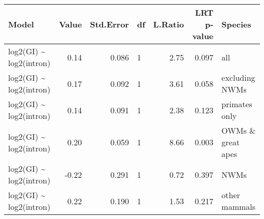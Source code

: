 \begin{table}[ht]
\centering
\begin{tabular}{lrrlrrl}
  \hline
Model & Value & Std.Error & df & L.Ratio & LRT p-value & Species \\ 
  \hline
log2(GI) \~{} log2(intron) & 0.14 & 0.086 & 1 & 2.75 & 0.097 & all \\ 
  log2(GI) \~{} log2(intron) & 0.17 & 0.092 & 1 & 3.61 & 0.058 & excluding NWMs \\ 
  log2(GI) \~{} log2(intron) & 0.14 & 0.091 & 1 & 2.38 & 0.123 & primates only \\ 
  log2(GI) \~{} log2(intron) & 0.20 & 0.059 & 1 & 8.66 & 0.003 & OWMs \& great apes \\ 
  log2(GI) \~{} log2(intron) & -0.22 & 0.291 & 1 & 0.72 & 0.397 & NWMs \\ 
  log2(GI) \~{} log2(intron) & 0.22 & 0.190 & 1 & 1.53 & 0.217 & other mammals \\ 
   \hline
\end{tabular}
\end{table}

